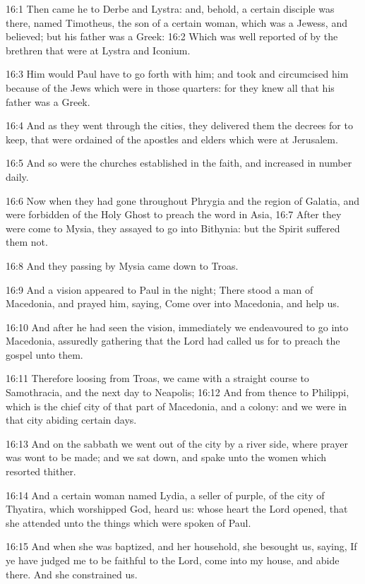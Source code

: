 16:1 Then came he to Derbe and Lystra: and, behold, a certain disciple was there, named Timotheus, the son of a certain woman, which was a Jewess, and believed; but his father was a Greek: 16:2 Which was well reported of by the brethren that were at Lystra and Iconium.

16:3 Him would Paul have to go forth with him; and took and circumcised him because of the Jews which were in those quarters: for they knew all that his father was a Greek.

16:4 And as they went through the cities, they delivered them the decrees for to keep, that were ordained of the apostles and elders which were at Jerusalem.

16:5 And so were the churches established in the faith, and increased in number daily.

16:6 Now when they had gone throughout Phrygia and the region of Galatia, and were forbidden of the Holy Ghost to preach the word in Asia, 16:7 After they were come to Mysia, they assayed to go into Bithynia: but the Spirit suffered them not.

16:8 And they passing by Mysia came down to Troas.

16:9 And a vision appeared to Paul in the night; There stood a man of Macedonia, and prayed him, saying, Come over into Macedonia, and help us.

16:10 And after he had seen the vision, immediately we endeavoured to go into Macedonia, assuredly gathering that the Lord had called us for to preach the gospel unto them.

16:11 Therefore loosing from Troas, we came with a straight course to Samothracia, and the next day to Neapolis; 16:12 And from thence to Philippi, which is the chief city of that part of Macedonia, and a colony: and we were in that city abiding certain days.

16:13 And on the sabbath we went out of the city by a river side, where prayer was wont to be made; and we sat down, and spake unto the women which resorted thither.

16:14 And a certain woman named Lydia, a seller of purple, of the city of Thyatira, which worshipped God, heard us: whose heart the Lord opened, that she attended unto the things which were spoken of Paul.

16:15 And when she was baptized, and her household, she besought us, saying, If ye have judged me to be faithful to the Lord, come into my house, and abide there. And she constrained us.

